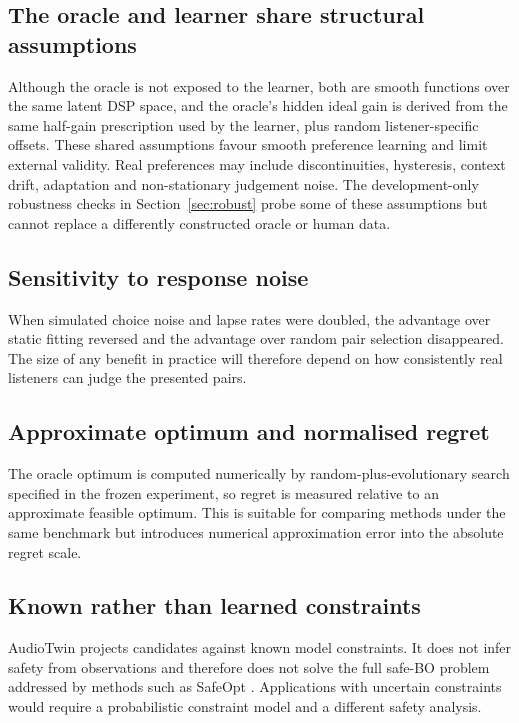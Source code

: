 \documentclass[preprint,12pt]{elsarticle}
\begin{document}
\subsection{The oracle and learner share structural assumptions}

Although the oracle is not exposed to the learner, both are smooth functions over the same latent DSP space, and the oracle's hidden ideal gain is derived from the same half-gain prescription used by the learner, plus random listener-specific offsets. These shared assumptions favour smooth preference learning and limit external validity. Real preferences may include discontinuities, hysteresis, context drift, adaptation and non-stationary judgement noise. The development-only robustness checks in Section~\ref{sec:robust} probe some of these assumptions but cannot replace a differently constructed oracle or human data.

\subsection{Sensitivity to response noise}

When simulated choice noise and lapse rates were doubled, the advantage over static fitting reversed and the advantage over random pair selection disappeared. The size of any benefit in practice will therefore depend on how consistently real listeners can judge the presented pairs.

\subsection{Approximate optimum and normalised regret}

The oracle optimum is computed numerically by random-plus-evolutionary search specified in the frozen experiment, so regret is measured relative to an approximate feasible optimum. This is suitable for comparing methods under the same benchmark but introduces numerical approximation error into the absolute regret scale.

\subsection{Known rather than learned constraints}

AudioTwin projects candidates against known model constraints. It does not infer safety from observations and therefore does not solve the full safe-BO problem addressed by methods such as SafeOpt \cite{sui2015}. Applications with uncertain constraints would require a probabilistic constraint model and a different safety analysis.
\end{document}
